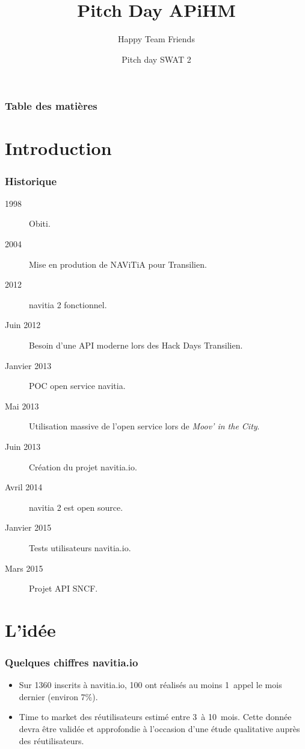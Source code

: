 \documentclass[table]{beamer}
\title{Pitch Day APiHM}
\author{Happy Team Friends}
\institute[Kisio Digital] %
{
  Kisio Digital\\
  20 rue Hector Malot\\
  75012 Paris, France}
\date{Pitch day SWAT 2}
\begin{document}
\begin{frame}
  \titlepage
\end{frame}

\begin{frame}%
  \frametitle{Table des matières}
  \tableofcontents[hideallsubsections]
\end{frame}

\section{Introduction}

\begin{frame}
  \frametitle{Historique}

  \begin{description}
  \item[1998] Obiti.
  \item[2004] Mise en prodution de NAViTiA pour Transilien.
  \item[2012] navitia 2 fonctionnel.
  \item[Juin 2012] Besoin d'une API moderne lors des Hack Days Transilien.
  \item[Janvier 2013] POC open service navitia.
  \item[Mai 2013] Utilisation massive de l'open service lors de
    \emph{Moov' in the City}.
  \item[Juin 2013] Création du projet navitia.io.
  \item[Avril 2014] navitia 2 est open source.
  \item[Janvier 2015] Tests utilisateurs navitia.io.
  \item[Mars 2015] Projet API SNCF.
  \end{description}
\end{frame}

\section{L'idée}


\begin{frame}
  \frametitle{Quelques chiffres navitia.io}

  \begin{itemize}
  \item Sur 1360 inscrits à navitia.io, 100 ont réalisés au moins
    1~appel le mois dernier (environ 7\%).
  \item Time to market des réutilisateurs estimé entre 3~à 10~mois.
    Cette donnée devra être validée et approfondie à l'occasion d'une
    étude qualitative auprès des réutilisateurs.
  \end{itemize}
\end{frame}
\end{document}
